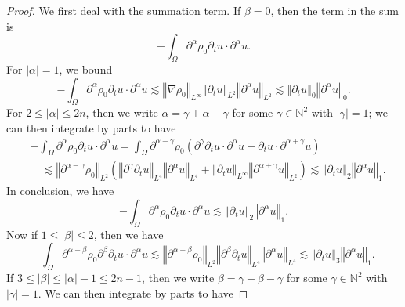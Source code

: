\documentclass[a4paper,reqno,11pt]{amsart}
\numberwithin{equation}{section}
\providecommand{\abs}[1]{\left\vert#1\right\vert}
\providecommand{\norm}[1]{\left\Vert#1\right\Vert}
\providecommand{\norm}[1]{\left\Vert#1\right\Vert}
\begin{document}
\begin{proof}
We first deal with the summation term. If $\beta=0$, then the term in the sum is
\begin{equation}
-\int_\Omega {\partial}^{\alpha} \rho_0 \partial_t  u \cdot{\partial}^{\alpha}   u.
\end{equation}
For $\abs{\alpha}=1$, we bound
\begin{equation}
-\int_\Omega {\partial}^{\alpha} \rho_0 \partial_t  u \cdot{\partial}^{\alpha}   u
 {\lesssim}\norm{\nabla \rho_0}_{L^\infty}  \norm{ {\partial_t} u}_{L^2}\norm{{\partial}^{\alpha}  u}_{L^2}
 {\lesssim}  \norm{ {\partial_t} u}_{0}\norm{ {\partial}^{\alpha}   u}_{0} .
\end{equation}
For $2\le\abs{\alpha}\le 2n$, then we write ${\alpha}=\gamma+\alpha-\gamma$ for some $\gamma\in \mathbb{N}^2$ with $\abs{\gamma}=1$; we can then integrate by parts to have
\begin{equation}
\begin{split}
&
-\int_\Omega {\partial}^{\alpha} \rho_0 \partial_t  u \cdot{\partial}^{\alpha}   u=\int_\Omega {\partial}^{{\alpha}-\gamma} \rho_0\left( {\partial}^{\gamma}{\partial_t} u\cdot{\partial}^{\alpha}   u+  {\partial_t} u\cdot{\partial}^{{\alpha}+\gamma}   u\right)
\\&\quad
{\lesssim}\norm{ {\partial}^{{\alpha}-\gamma} \rho_0}_{L^2} \left( \norm{ {\partial}^{\gamma}{\partial_t} u}_{L^4}\norm{{\partial}^{\alpha}   u}_{L^4}+   \norm{{\partial_t} u}_{L^\infty}\norm{{\partial}^{{\alpha}+\gamma}   u}_{L^2}\right)
{\lesssim} \norm{ {\partial_t} u}_{2}\norm{{\partial}^{\alpha}   u}_{1}.
\end{split}
\end{equation}
In conclusion, we have
\begin{equation}\label{111}
-\int_\Omega {\partial}^{\alpha} \rho_0 \partial_t  u \cdot{\partial}^{\alpha}  u
{\lesssim} \norm{ {\partial_t} u}_{2}\norm{{\partial}^{\alpha}   u}_{1}.
\end{equation}
Now if $1\le \abs{\beta}\le2$, then we have
\begin{equation}
-\int_\Omega {\partial}^{{\alpha}-\beta} \rho_0 {\partial}^{\beta}\partial_t  u \cdot{\partial}^{\alpha}   u
  {\lesssim}\norm{ {\partial}^{{\alpha}-\beta}\rho_0}_{L^2}   \norm{ {\partial}^{\beta}{\partial_t} u}_{L^4}\norm{{\partial}^{\alpha}  u}_{L^4}
  {\lesssim} \norm{ {\partial_t} u}_{3}\norm{{\partial}^{\alpha}   u}_{1}.
\end{equation}
If $3\le \abs{\beta}\le \abs{\alpha}-1\le 2n-1$, then we write $\beta=\gamma+\beta-\gamma$ for some $\gamma\in \mathbb{N}^2$ with $\abs{\gamma}=1$. We can then integrate by parts to have

\end{proof}
\end{document}
